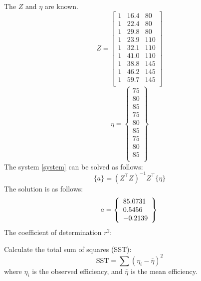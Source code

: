 \documentclass[12pt, a4paper]{article}
\numberwithin{equation}{section}
\begin{document}
The $Z$ and $\eta$ are known.\\
\begin{equation}
   Z=\begin{bmatrix}
        1 & 16.4 & 80 \\ 
        1 & 22.4 & 80 \\ 
        1 & 29.8 & 80 \\ 
        1 & 23.9 & 110 \\ 
        1 & 32.1 & 110 \\ 
        1 & 41.0 & 110 \\ 
        1 & 38.8 & 145 \\ 
        1 & 46.2 & 145 \\ 
        1 & 59.7 & 145 \\ 
    \end{bmatrix} 
\end{equation}
\begin{equation}
\eta=\left\{\begin{array}{c}
75 \\
80 \\
85 \\
75 \\
80 \\
85 \\
75 \\
80 \\
85 \\
\end{array}\right\}
\end{equation}
The system \ref{system} can be solved as follows:
\begin{equation}
    \{a\}=(Z^{\top} Z)^{-1}Z^{\top}\{\eta\}
\end{equation}
The solution is as follows:
\begin{equation}
    a=\left\{\begin{array}{l}
    85.0731 \\
    0.5456 \\
    -0.2139
\end{array}\right\} \\
\end{equation}
The coefficient of determination $r^2$:

Calculate the total sum of squares (SST):
\begin{equation}
    \text{SST} = \sum (\eta_i - \bar{\eta})^2
\end{equation}
where $\eta_i$ is the observed efficiency, and $\bar{\eta}$ is the mean efficiency.
\end{document}
